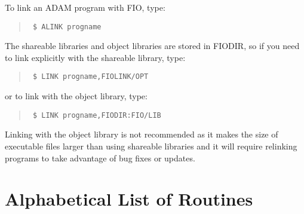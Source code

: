 \documentclass[twoside,11pt]{article}
\renewcommand{\_}{\texttt{\symbol{95}}}
\begin{document}
To link an ADAM program with FIO, type:

\begin{quote}{\tt
\$ ALINK progname
}
\end{quote}

The shareable libraries and object libraries are stored in FIO\_DIR, so if you
need to link explicitly with the shareable library, type:

\begin{quote}{\tt
\$ LINK progname,FIO\_LINK/OPT
}
\end{quote}

or to link with the object library, type:

\begin{quote}{\tt
\$ LINK progname,FIO\_DIR:FIO/LIB
}
\end{quote}

Linking with the object library is not recommended as it makes the size of
executable files larger than using shareable libraries and it will require
relinking programs to take advantage of bug fixes or updates.

\appendix

\newpage
\section{Alphabetical List of Routines}
\end{document}
